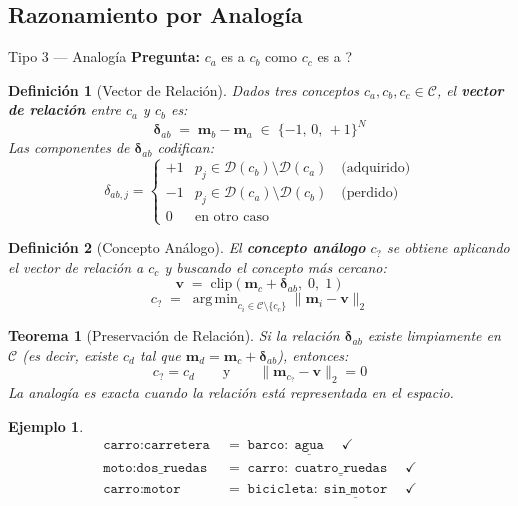 \documentclass[12pt]{article}
\newtheorem{theorem}{Teorema}[section]
\newtheorem{definition}{Definición}[section]
\newtheorem{example}{Ejemplo}[section]
\begin{document}
\subsection{Razonamiento por Analogía}

\begin{razonbox}{Tipo 3 — Analogía}
	\textbf{Pregunta:} $c_a$ es a $c_b$ como $c_c$ es a \underline{\hspace{1cm}}?
\end{razonbox}

\begin{definition}[Vector de Relación]
	Dados tres conceptos $c_a, c_b, c_c \in \mathcal{C}$, el \textbf{vector de
		relación} entre $c_a$ y $c_b$ es:
	\[
	\bm{\delta}_{ab} \;=\; \mathbf{m}_b - \mathbf{m}_a \;\in\; \{-1,\,0,\,+1\}^N
	\]
	Las componentes de $\bm{\delta}_{ab}$ codifican:
	\[
	\delta_{ab,j} =
	\begin{cases}
		+1 & p_j \in \mathcal{D}(c_b) \setminus \mathcal{D}(c_a)
		\quad\text{(adquirido)}\\
		-1 & p_j \in \mathcal{D}(c_a) \setminus \mathcal{D}(c_b)
		\quad\text{(perdido)}\\
		0 & \text{en otro caso}
	\end{cases}
	\]
\end{definition}

\begin{definition}[Concepto Análogo]
	El \textbf{concepto análogo} $c_?$ se obtiene aplicando el vector de relación
	a $c_c$ y buscando el concepto más cercano:
	\[
	\mathbf{v} \;=\; \mathrm{clip}\!\left(
	\mathbf{m}_c + \bm{\delta}_{ab},\; 0,\; 1
	\right)
	\]
	\[
	c_? \;=\; \operatorname{arg\,min}_{c_i \in \mathcal{C} \setminus \{c_c\}}
	\bigl\|\mathbf{m}_i - \mathbf{v}\bigr\|_2
	\]
\end{definition}

\begin{theorem}[Preservación de Relación]
	Si la relación $\bm{\delta}_{ab}$ existe limpiamente en $\mathcal{C}$
	(es decir, existe $c_d$ tal que $\mathbf{m}_d = \mathbf{m}_c + \bm{\delta}_{ab}$),
	entonces:
	\[
	c_? = c_d \qquad \text{y} \qquad
	\bigl\|\mathbf{m}_{c_?} - \mathbf{v}\bigr\|_2 = 0
	\]
	La analogía es exacta cuando la relación está representada en el espacio.
\end{theorem}

\begin{example}
	\begin{align*}
		\texttt{carro} : \texttt{carretera}
		&\;=\; \texttt{barco} : \underline{\;\texttt{agua}\;}
		\quad\checkmark \\[4pt]
		\texttt{moto} : \texttt{dos\_ruedas}
		&\;=\; \texttt{carro} : \underline{\;\texttt{cuatro\_ruedas}\;}
		\quad\checkmark \\[4pt]
		\texttt{carro} : \texttt{motor}
		&\;=\; \texttt{bicicleta} : \underline{\;\texttt{sin\_motor}\;}
		\quad\checkmark
	\end{align*}
\end{example}
\end{document}
